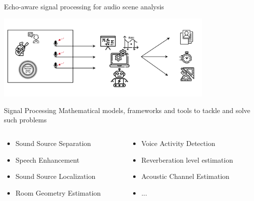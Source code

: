 \begin{frame}[t]{Echo-aware \alert{signal processing} for audio scene analysis}

    \begin{center}
        \includegraphics[trim={0 35mm 0 35mm},clip,width=0.8\textwidth]{figures/scene_analysis.png}
    \end{center}

    \pause
    \begin{mydefblock}{Signal Processing}
        Mathematical models, frameworks and tools to tackle and solve such problems
    \end{mydefblock}

    \pause
    \begin{columns}[T,onlytextwidth]
        \begin{column}{0.48\textwidth}
            \small
            \begin{itemize}
                \item Sound Source Separation
                \item Speech Enhancement
                \item Sound Source Localization\hspace{1em}
                \item Room Geometry Estimation
            \end{itemize}
        \end{column}

        \begin{column}{0.48\textwidth}
            \begin{itemize}\small
                \item Voice Activity Detection
                \item Reverberation level estimation\hspace{1em}
                \item Acoustic Channel Estimation
                \item ...
            \end{itemize}


\end{column}
\end{columns}
\end{frame}
